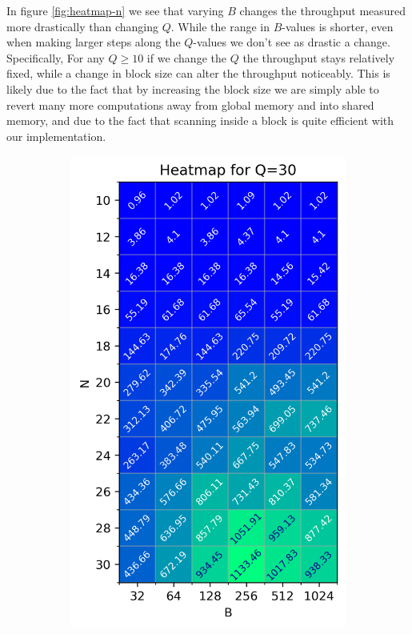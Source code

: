 \documentclass[twocolumn]{article}
\begin{document}
In figure \ref{fig:heatmap-n} we see that varying $B$ changes the throughput measured more drastically than changing $Q$. While the range in $B$-values is shorter, even when making larger steps along the $Q$-values we don't see as drastic a change. Specifically, For any $Q\geq 10$ if we change the $Q$ the throughput stays relatively fixed, while a change in block size can alter the throughput noticeably. This is likely due to the fact that by increasing the block size we are simply able to revert many more computations away from global memory and into shared memory, and due to the fact that scanning inside a block is quite efficient with our implementation.

\begin{figure}[h]
    \centering
    \begin{subfigure}{0.31\linewidth}
        \includegraphics[width=\linewidth]{report/plots/heatmap_BvN_Q=30.png}

\end{subfigure}
\end{figure}
\end{document}
